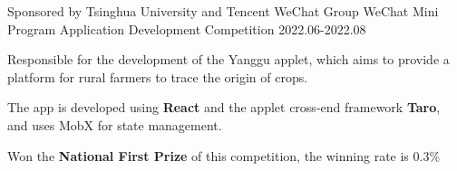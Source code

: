 
\begin{cventries}

\cventry
    {Sponsored by Tsinghua University and Tencent WeChat Group} %
    {WeChat Mini Program Application Development Competition} %
    {} %
    {2022.06-2022.08} %
    {
    \begin{cvitems} %
        \item {Responsible for the development of the Yanggu applet, which aims to provide a platform for rural farmers to trace the origin of crops.}
        \item {The app is developed using \textbf{React} and the applet cross-end framework \textbf{Taro}, and uses MobX for state management.}
        \item {Won the \textbf{National First Prize} of this competition, the winning rate is 0.3\%}
    \end{cvitems}
    }

\end{cventries}
